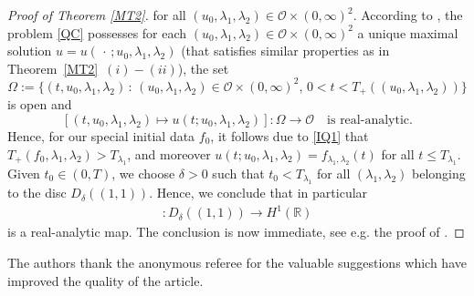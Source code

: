 \documentclass[11pt,reqno]{amsart}
\numberwithin{equation}{section}
\newcommand{\0}{\Omega}
\newcommand{\cO}{\mathcal{O}}
\newcommand{\R}{\mathbb{R}}
\numberwithin{equation}{section}
\begin{document}
\begin{proof}[Proof of Theorem \ref{MT2}]
for all $(u_0,\lambda_1,\lambda_2)\in \cO\times (0,\infty)^2.$
According to \cite[Theorem~8.1.1 and Theorem~8.3.9]{L95}, the  problem \eqref{QC} possesses for each $(u_0,\lambda_1,\lambda_2)\in \cO\times (0,\infty)^2$ a unique maximal solution $u=u(\,\cdot\,; u_0,\lambda_1,\lambda_2)$ 
(that satisfies similar properties as in Theorem~\ref{MT2}~$(i)-(ii)$), the  set 
$$\Omega:=\{(t,u_0,\lambda_1,\lambda_2)\,:\, (u_0,\lambda_1,\lambda_2)\in \cO\times (0,\infty)^2,\, 0<t<T_+((u_0,\lambda_1,\lambda_2))\}$$
is open and 
\[
[(t,u_0,\lambda_1,\lambda_2)\mapsto u(t; u_0,\lambda_1,\lambda_2)]:\0\to \cO\quad \text{is real-analytic.}
\]
Hence, for our special initial data $f_0$, it follows due to \eqref{IQ1} that $T_+(f_0,\lambda_1,\lambda_2)>T_{\lambda_1}$, and moreover $u(t; u_0,\lambda_1,\lambda_2)=f_{\lambda_1,\lambda_2}(t)$ for all $t\leq T_{\lambda_1}$.
Given  $t_0\in(0,T)$, we choose $\delta>0$ such that  $t_0<T_{\lambda_1}$ for all $(\lambda_1,\lambda_2)$ belonging to the disc $ D_\delta((1,1))$.
Hence, we    conclude  that in particular
\begin{align*}
[(\lambda_1,\lambda_2)\mapsto f_{\lambda_1,\lambda_2}(t_0)]:D_\delta((1,1))\to H^1(\R)
\end{align*}
is  a real-analytic map.
The conclusion is now immediate, see e.g. the proof of \cite[Theorem~1.3]{M16x}.
\end{proof}


 \vspace{0.5cm}
\hspace{-0.5cm}{ \bf Acknowledgements} 
The authors thank the anonymous referee for  the valuable suggestions which have improved the quality of the article.






\end{document}
